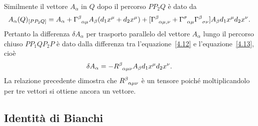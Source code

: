 Similmente il vettore $A_{\alpha}$ in $Q$ dopo il percorso $PP_2Q$ è dato da
\begin{equation}
  A_{\alpha}(Q)_{[PP_2Q]} = A_{\alpha} + \tensor{\Gamma}{^{\beta}_{\alpha \mu}}
  A_{\beta} (d_1 x^{\mu}+d_2 x^{\mu}) + [ \tensor{\Gamma}{^{\beta}_{\alpha \mu,
      \nu}} + \tensor{\Gamma}{^{\sigma}_{\alpha \mu}}
  \tensor{\Gamma}{^{\beta}_{\sigma \nu}}] A_{\beta} d_1 x^{\mu} d_2 x^{\nu}.
  \label{4.13}
\end{equation}
Pertanto la differenza $\delta A_{\alpha}$ per trasporto parallelo del vettore
$A_{\alpha}$ lungo il percorso chiuso $P P_1 Q P_2 P$ è dato dalla differenza
tra l'equazione~\eqref{4.12} e l'equazione~\eqref{4.13}, cioè
\begin{equation}
  \delta A_{\alpha} = - \tensor{R}{^{\beta}_{\alpha \mu \nu}} A_{\beta} d_1
  x^{\mu} d_2 x^{\nu}.
\end{equation}
La relazione precedente dimostra che $\tensor{R}{^{\beta}_{\alpha \mu \nu}}$ è
un tensore poiché moltiplicandolo per tre vettori si ottiene ancora un vettore.

\subsection{Identità di Bianchi}
\label{sec:identita-bianchi}

